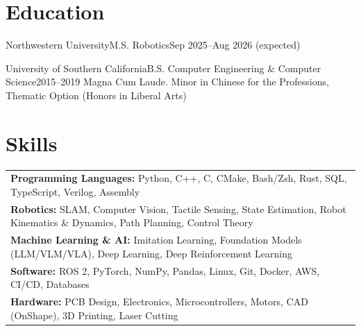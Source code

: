 \documentclass[letterpaper,10pt]{article}
\begin{document}
\section{Education}
\begin{educationshort}{Northwestern University}{M.S. Robotics}{Sep 2025--Aug 2026 (expected)}%
\end{educationshort}
\begin{education}{University of Southern California}{B.S. Computer Engineering \& Computer Science}{2015--2019}
    Magna Cum Laude. Minor in Chinese for the Professions, Thematic Option (Honors in Liberal Arts)
\end{education}

\section{Skills}
\begin{tabularx}{\linewidth}{@{}X@{}}
\textbf{Programming Languages:} Python, C++, C, CMake, Bash/Zsh, Rust, SQL, TypeScript, Verilog, Assembly \\
\textbf{Robotics:} SLAM, Computer Vision, Tactile Sensing, State Estimation, Robot Kinematics \& Dynamics, Path Planning, Control Theory \\
\textbf{Machine Learning \& AI:} Imitation Learning, Foundation Models (LLM/VLM/VLA), Deep Learning, Deep Reinforcement Learning \\
\textbf{Software:} ROS 2, PyTorch, NumPy, Pandas, Linux, Git, Docker, AWS, CI/CD, Databases \\
\textbf{Hardware:} PCB Design, Electronics, Microcontrollers, Motors, CAD (OnShape), 3D Printing, Laser Cutting \\
\end{tabularx}
\end{document}
